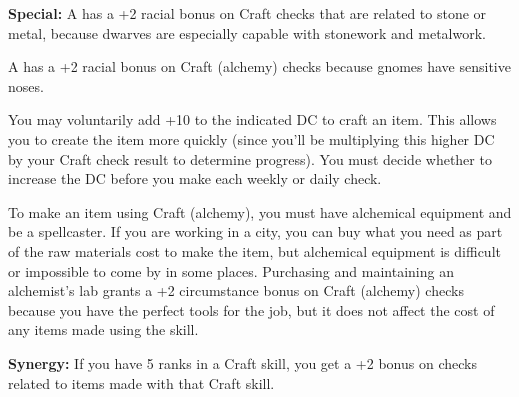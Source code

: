 \textbf{Special:} A  has a +2 racial bonus on Craft checks that are related 
to stone or metal, because dwarves are especially capable with stonework and metalwork.

A  has a +2 racial bonus on Craft (alchemy) checks because gnomes have sensitive 
noses.

You may voluntarily add +10 to the indicated DC to craft an item. This allows you 
to create the item more quickly (since you'll be multiplying this higher DC by 
your Craft check result to determine progress). You must decide whether to increase 
the DC before you make each weekly or daily check.

To make an item using Craft (alchemy), you must have alchemical equipment and be 
a spellcaster. If you are working in a city, you can buy what you need as part 
of the raw materials cost to make the item, but alchemical equipment is difficult 
or impossible to come by in some places. Purchasing and maintaining an alchemist's 
lab grants a +2 circumstance bonus on Craft (alchemy) checks because you have the 
perfect tools for the job, but it does not affect the cost of any items made using 
the skill.

\textbf{Synergy:} If you have 5 ranks in a Craft skill, you get a +2 bonus on  
checks related to items made with that Craft skill.
